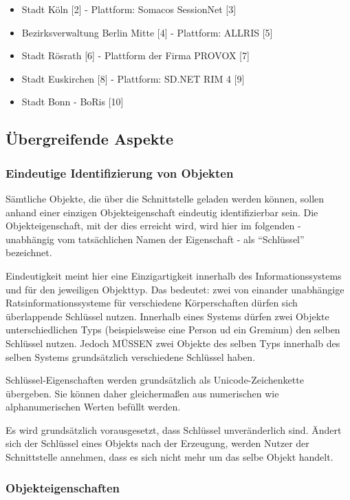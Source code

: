 \documentclass[,a4paper]{article}
\begin{document}
\begin{itemize}
\item
  Stadt Köln {[}2{]} - Plattform: Somacos SessionNet {[}3{]}
\item
  Bezirksverwaltung Berlin Mitte {[}4{]} - Plattform: ALLRIS {[}5{]}
\item
  Stadt Rösrath {[}6{]} - Plattform der Firma PROVOX {[}7{]}
\item
  Stadt Euskirchen {[}8{]} - Plattform: SD.NET RIM 4 {[}9{]}
\item
  Stadt Bonn - BoRis {[}10{]}
\end{itemize}

\subsection{Übergreifende Aspekte}

\subsubsection{Eindeutige Identifizierung von Objekten}

Sämtliche Objekte, die über die Schnittstelle geladen werden können,
sollen anhand einer einzigen Objekteigenschaft eindeutig identifizierbar
sein. Die Objekteigenschaft, mit der dies erreicht wird, wird hier im
folgenden - unabhängig vom tatsächlichen Namen der Eigenschaft - als
``Schlüssel'' bezeichnet.

Eindeutigkeit meint hier eine Einzigartigkeit innerhalb des
Informationssystems und für den jeweiligen Objekttyp. Das bedeutet: zwei
von einander unabhängige Ratsinformationssysteme für verschiedene
Körperschaften dürfen sich überlappende Schlüssel nutzen. Innerhalb
eines Systems dürfen zwei Objekte unterschiedlichen Typs (beispielsweise
eine Person ud ein Gremium) den selben Schlüssel nutzen. Jedoch MÜSSEN
zwei Objekte des selben Typs innerhalb des selben Systems grundsätzlich
verschiedene Schlüssel haben.

Schlüssel-Eigenschaften werden grundsätzlich als Unicode-Zeichenkette
übergeben. Sie können daher gleichermaßen aus numerischen wie
alphanumerischen Werten befüllt werden.

Es wird grundsätzlich vorausgesetzt, dass Schlüssel unveränderlich sind.
Ändert sich der Schlüssel eines Objekts nach der Erzeugung, werden
Nutzer der Schnittstelle annehmen, dass es sich nicht mehr um das selbe
Objekt handelt.

\subsubsection{Objekteigenschaften}
\end{document}
